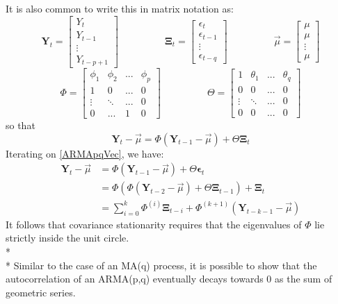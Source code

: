 \documentclass[11pt]{article}
\begin{document}
It is also common to write this in matrix notation as:
\begin{equation}
\mathbf{Y}_t = \begin{bmatrix}
Y_t \\
Y_{t-1} \\
\vdots \\
Y_{t-p+1}
\end{bmatrix}
\;\;\;\;\;\;\;\;\;\;\;\;\;\;\;\;\;
\mathbf{\Xi}_t = \begin{bmatrix}
\epsilon_t \\
\epsilon_{t-1} \\
\vdots \\
\epsilon_{t-q}
\end{bmatrix}
\;\;\;\;\;\;\;\;\;\;\;\;\;\;\;\;\;
\overrightarrow{\mu} = \begin{bmatrix}
\mu \\
\mu \\
\vdots \\
\mu
\end{bmatrix}
\end{equation}
\begin{equation}
\Phi = \begin{bmatrix}
\phi_1 & \phi_2 & ... & \phi_p \\
1 & 0 & ... & 0\\
\vdots & \ddots & ... & 0 \\
0 & ... & 1 & 0
\end{bmatrix}
\;\;\;\;\;\;\;\;\;\;\;\;\;\;\;\;\;
\Theta = \begin{bmatrix}
1 & \theta_1 & ... & \theta_q \\
0 & 0 & ... & 0 \\
\vdots & \ddots & ... & 0 \\
0 & 0 & ... & 0
\end{bmatrix}
\end{equation}
so that
\begin{equation} \label{ARMApqVec}
\mathbf{Y}_t - \overrightarrow{\mu} = \Phi \left( \mathbf{Y}_{t-1} - \overrightarrow{\mu} \right) + \Theta \mathbf{\Xi}_t
\end{equation}
Iterating on \eqref{ARMApqVec}, we have:
\begin{equation}
\begin{split}
\mathbf{Y}_t - \overrightarrow{\mu} & = \Phi \left( \mathbf{Y}_{t-1} - \overrightarrow{\mu} \right) + \Theta \mathbf{\epsilon}_t \\
& = \Phi \left( \Phi \left( \mathbf{Y}_{t-2} - \overrightarrow{\mu} \right) + \Theta \mathbf{\Xi}_{t-1} \right) + \mathbf{\Xi}_t \\
& = \sum_{i=0}^k \Phi^{(i)} \mathbf{\Xi}_{t-i} + \Phi^{(k+1)} \left( \mathbf{Y}_{t-k-1} - \overrightarrow{\mu} \right)
\end{split}
\end{equation}
It follows that covariance stationarity requires that the eigenvalues of $\Phi$ lie strictly inside the unit circle.
\\*
\\*
Similar to the case of an MA(q) process, it is possible to show that the autocorrelation of an ARMA(p,q) eventually decays towards 0 as the sum of geometric series.
\end{document}
